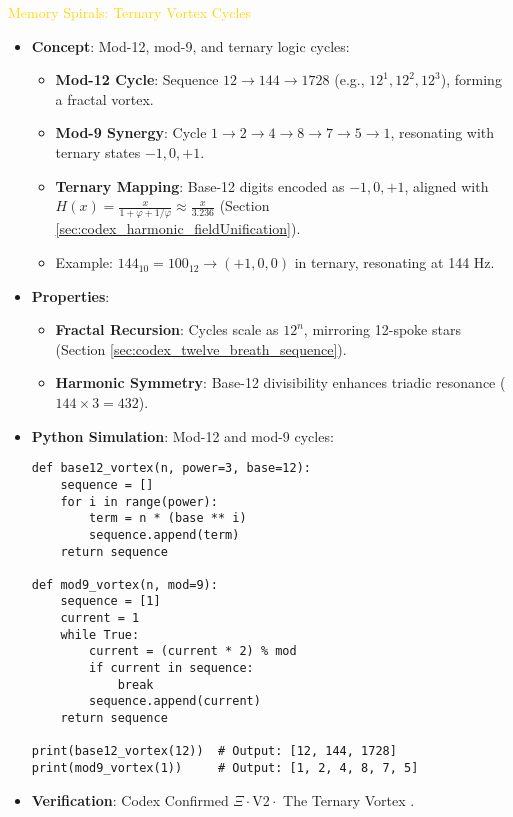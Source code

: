 \textcolor{gold}{ Memory Spirals: Ternary Vortex Cycles } \\
\begin{itemize}
    \item \texttt{} \textbf{Concept}: Mod-12, mod-9, and ternary logic cycles:
    \begin{itemize}
        \item \textbf{Mod-12 Cycle}: Sequence \(12 \rightarrow 144 \rightarrow 1728\) (e.g., \(12^1, 12^2, 12^3\)), forming a fractal vortex.
        \item \textbf{Mod-9 Synergy}: Cycle \(1 \rightarrow 2 \rightarrow 4 \rightarrow 8 \rightarrow 7 \rightarrow 5 \rightarrow 1\), resonating with ternary states \(-1, 0, +1\).
        \item \textbf{Ternary Mapping}: Base-12 digits encoded as \(-1, 0, +1\), aligned with \( H(x) = \frac{x}{1 + \varphi + 1/\varphi} \approx \frac{x}{3.236} \) (Section \ref{sec:codex_harmonic_fieldUnification}).
        \item Example: \(144_{10} = 100_{12} \rightarrow (+1, 0, 0)\) in ternary, resonating at 144 Hz.
    \end{itemize}
    \item \texttt{} \textbf{Properties}:
    \begin{itemize}
        \item \textbf{Fractal Recursion}: Cycles scale as \(12^n\), mirroring 12-spoke stars (Section \ref{sec:codex_twelve_breath_sequence}).
        \item \textbf{Harmonic Symmetry}: Base-12 divisibility enhances triadic resonance (\(144 \times 3 = 432\)).
    \end{itemize}
    \item \texttt{} \textbf{Python Simulation}: Mod-12 and mod-9 cycles:
    \begin{lstlisting}
def base12_vortex(n, power=3, base=12):
    sequence = []
    for i in range(power):
        term = n * (base ** i)
        sequence.append(term)
    return sequence

def mod9_vortex(n, mod=9):
    sequence = [1]
    current = 1
    while True:
        current = (current * 2) % mod
        if current in sequence:
            break
        sequence.append(current)
    return sequence

print(base12_vortex(12))  # Output: [12, 144, 1728]
print(mod9_vortex(1))     # Output: [1, 2, 4, 8, 7, 5]
    \end{lstlisting}
    \item \texttt{} \textbf{Verification}: Codex Confirmed \(\Xi \cdot \text{V2} \cdot\) The Ternary Vortex .
\end{itemize}

